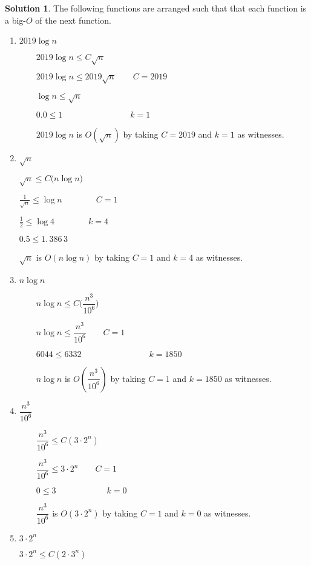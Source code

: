 \documentclass{article}
\theoremstyle{definition}
\newtheorem*{solution}{Solution}
\begin{document}
\begin{solution}
The following functions are arranged such that that each function is a big-$%
O $ of the next function.

\begin{enumerate}
\item $2019\log {n}$

$\qquad 2019\log {n\leq C}\sqrt{n}$

$\qquad 2019\log {n\leq 2019}\sqrt{n}\qquad C=2019$

$\qquad \log {n\leq }\sqrt{n}$

$\qquad 0.0\leq 1\qquad \qquad \qquad \qquad k=1$

$\qquad 2019\log {n}$ is $O(\sqrt{n})$ by taking $C=2019$ and $k=1$ as
witnesses. \bigskip

\item $\sqrt{n}$

\qquad $\sqrt{n}\leq C(n\log {n)}$

\qquad $\frac{1}{\sqrt{n}}\leq \log {n\qquad \qquad C=1}$

\qquad $\frac{1}{2}\leq \log 4\qquad \qquad k=4$

\qquad $0.5\leq 1.\,\allowbreak 386\,3$

\qquad $\sqrt{n}$ is $O(n\log {n})$ by taking $C=1$ and $k=4$ as witnesses.
\bigskip

\item $n\log {n}$

$\qquad n\log {n\leq C(}\dfrac{n^{3}}{10^{6}})$

$\qquad n\log {n\leq }\dfrac{n^{3}}{10^{6}}\qquad C=1$

$\qquad 6044\leq 6332\qquad \qquad \qquad \qquad k=1850$

$\qquad n\log {n}$ is $O(\dfrac{n^{3}}{10^{6}})$ by taking $C=1$ and $k=1850$
as witnesses. \bigskip 

\item $\dfrac{n^{3}}{10^{6}}$

$\qquad \dfrac{n^{3}}{10^{6}}\leq C(3\cdot 2^{n})$

$\qquad \dfrac{n^{3}}{10^{6}}\leq 3\cdot 2^{n}\qquad C=1$

$\qquad 0\leq 3\qquad \qquad \qquad k=0$

$\qquad \dfrac{n^{3}}{10^{6}}$ is $O(3\cdot 2^{n})$ by taking $C=1$ and $k=0$
as witnesses. \bigskip 

\item $3\cdot 2^{n}$

\qquad $3\cdot 2^{n}\leq C(2\cdot 3^{n})$


\end{enumerate}
\end{solution}
\end{document}

